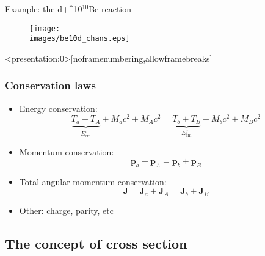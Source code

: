 \documentclass[english,10pt]{beamer}
\newcommand{\gitem}[1]{\item {\textcolor{deepcarmine}{  #1}}}
\newcommand{\images}{images}
\def\nuc#1#2{\relax\ifmmode{}^{#1}{\protect\text{#2}}\else${}^{#1}$#2\fi}
\begin{document}

\begin{frame}{Example: the d+\nuc{10}{Be} reaction}
\begin{figure}{\par \resizebox*{0.75\textwidth}{!}
{\texttt{[image: \\images/be10d\_chans.eps]}} \par}
\end{figure}

\end{frame}


\begin{frame}<presentation:0>[noframenumbering,allowframebreaks]
\frametitle{Conservation laws}
    
\begin{itemize}
\setlength{\itemsep}{12pt}
\gitem{Energy conservation:}
$$
\underbrace{T_a+ T_A}_{E^{i}_\mathrm{cm}} + M_a c^2 + M_A c^2=  \underbrace{T_b+ T_B}_{E^{f}_\mathrm{cm}}  +  M_b c^2 +M_B c^2 
$$
\gitem{Momentum conservation:}
$$
\boldsymbol{p}_{a}+\boldsymbol{p}_{A}=\boldsymbol{p}_{b}+\boldsymbol{p}_{B}
$$

\gitem{Total angular momentum conservation:}
$$
\boldsymbol{J}=\boldsymbol{J}_{a}+\boldsymbol{J}_{A}=\boldsymbol{J}_{b}+\boldsymbol{J}_{B}
$$

\gitem{Other}: charge, parity, etc


\end{itemize}
    
    
\end{frame}




\subsection{The concept of cross section}
\end{document}
